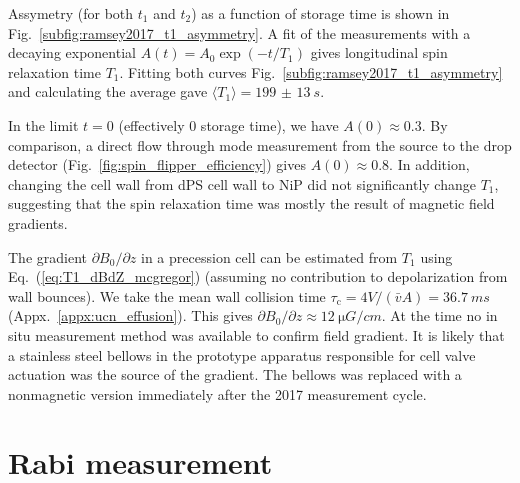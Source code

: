 Assymetry (for both $t_1$ and $t_2$) as a function of storage time is shown in Fig.~\ref{subfig:ramsey2017_t1_asymmetry}. A fit of the measurements with a decaying exponential $A(t)=A_0\exp(-t/T_1)$ gives longitudinal spin relaxation time $T_1$. Fitting both curves Fig.~\ref{subfig:ramsey2017_t1_asymmetry} and calculating the average gave $\langle T_1 \rangle=\qty{199(13)}{s}$. 

In the limit $t=0$ (effectively 0 storage time), we have $A(0)\approx 0.3$. By comparison, a direct flow through mode measurement from the \ucn source to the drop detector (Fig.~\ref{fig:spin_flipper_efficiency}) gives $A(0)\approx 0.8$. In addition, changing the cell wall from dPS cell wall to NiP did not significantly change $T_1$, suggesting that the spin relaxation time was mostly the result of magnetic field gradients.

The gradient $\partial B_0 / \partial z$ in a precession cell can be estimated from $T_1$ using Eq.~(\ref{eq:T1_dBdZ_mcgregor}) (assuming no contribution to depolarization from wall bounces). We take the mean wall collision time $\tau_\text{c}=4V/(\bar{v}A)=\qty{36.7}{ms}$ (Appx.~\ref{appx:ucn_effusion}). This gives $\partial B_0/\partial z\approx \qty{12}{\micro G\per cm}$. At the time no in situ measurement method was available to confirm field gradient. It is likely that a stainless steel bellows in the prototype apparatus responsible for cell valve actuation was the source of the gradient. The bellows was replaced with a nonmagnetic version immediately after the 2017 measurement cycle.


\section{Rabi measurement}\label{sec:2017_rabi_measurement}



